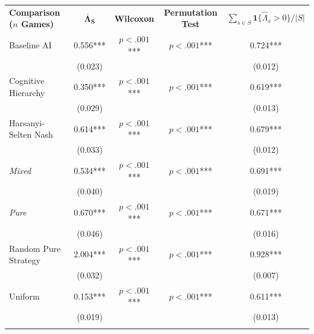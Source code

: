 \begin{tabular}{l c c c c}
    \hline \addlinespace[4pt]
    \textbf{Comparison ($n$ Games)} & \multicolumn{1}{c}{\textbf{$\mathbf{\bar{\Lambda}_S}$}} & \multicolumn{1}{c}{\textbf{Wilcoxon}} & \multicolumn{1}{c}{\textbf{Permutation Test}} & \multicolumn{1}{c}{\textbf{$\sum_{s \in S} \mathbf 1\{\hat \Lambda_s > 0\} / |S|$}} \\
\addlinespace[6pt]\hline\addlinespace[6pt]
Baseline AI & \phantom{(}\phantom{....}0.556*** & $p<.001$*** & $p<.001$*** & \phantom{(}\phantom{....}0.724*** \\
 &  (0.023) & & &  (0.012) \\
\addlinespace[2pt]
\addlinespace[6pt]
Cognitive Hierarchy & \phantom{(}\phantom{....}0.350*** & $p<.001$*** & $p<.001$*** & \phantom{(}\phantom{....}0.619*** \\
 &  (0.029) & & &  (0.013) \\
\addlinespace[2pt]
\addlinespace[6pt]
Harsanyi-Selten Nash & \phantom{(}\phantom{....}0.614*** & $p<.001$*** & $p<.001$*** & \phantom{(}\phantom{....}0.679*** \\
 &  (0.033) & & &  (0.012) \\
\addlinespace[2pt]
\quad\quad \textit{Mixed} & \phantom{(}\phantom{....}0.534*** & $p<.001$*** & $p<.001$*** & \phantom{(}\phantom{....}0.691*** \\
 &  (0.040) & & &  (0.019) \\
\addlinespace[2pt]
\quad\quad \textit{Pure} & \phantom{(}\phantom{....}0.670*** & $p<.001$*** & $p<.001$*** & \phantom{(}\phantom{....}0.671*** \\
 &  (0.046) & & &  (0.016) \\
\addlinespace[2pt]
\addlinespace[6pt]
Random Pure Strategy & \phantom{(}\phantom{....}2.004*** & $p<.001$*** & $p<.001$*** & \phantom{(}\phantom{....}0.928*** \\
 &  (0.032) & & &  (0.007) \\
\addlinespace[2pt]
\addlinespace[6pt]
Uniform & \phantom{(}\phantom{....}0.153*** & $p<.001$*** & $p<.001$*** & \phantom{(}\phantom{....}0.611*** \\
 &  (0.019) & & &  (0.013) \\
\addlinespace[2pt]
\hline
\end{tabular}
